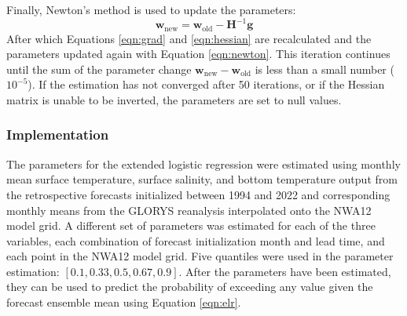 \documentclass[12pt]{article}
\begin{document}
Finally, Newton's method is used to update the parameters:
\begin{equation}
    \mathbf{w}_{\textrm{new}} = \mathbf{w}_{\textrm{old}} - \mathbf{H}^{-1} \mathbf{g}
    \label{eqn:newton}
\end{equation}
After which Equations \ref{eqn:grad} and \ref{eqn:hessian} are recalculated and the parameters
updated again with Equation \ref{eqn:newton}.
This iteration continues until the sum of the parameter change 
$\mathbf{w}_{\textrm{new}} - \mathbf{w}_{\textrm{old}}$ is less than a small number ($10^{-5}$).
If the estimation has not converged after 50 iterations, or if the Hessian matrix 
is unable to be inverted, the parameters are set to null values. 

\subsubsection{Implementation}

The parameters for the extended logistic regression were 
estimated using monthly mean surface temperature, surface salinity, and bottom temperature output
from the retrospective forecasts initialized between 1994 and 2022
and corresponding monthly means from the GLORYS reanalysis \citep{Jean-Michel2021} interpolated
onto the NWA12 model grid.
A different set of parameters was estimated for each of the three variables,
each combination of forecast initialization month and lead time, and each
point in the NWA12 model grid. 
Five quantiles were used in the parameter estimation: $ [0.1, 0.33, 0.5, 0.67, 0.9]$. 
After the parameters have been estimated, 
they can be used to predict the probability of exceeding any value given the forecast ensemble mean
using Equation \ref{eqn:elr}. 



\end{document}
